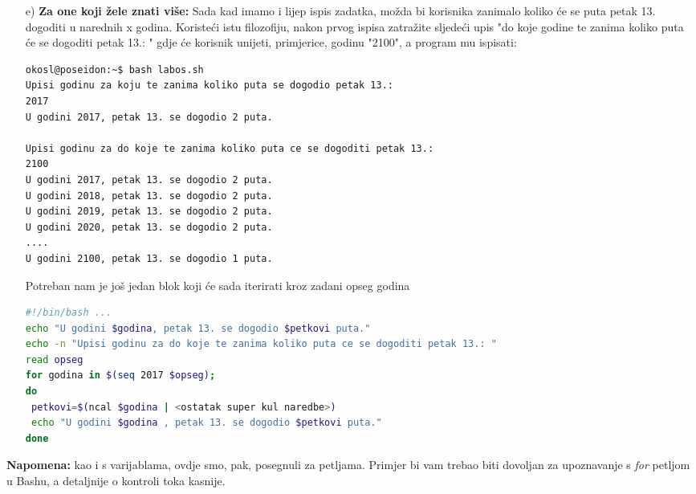 \documentclass{exam}
\begin{document}
\begin{itemize}
\item[e)]
  \textbf{Za one koji žele znati više:}
  Sada kad imamo i lijep ispis zadatka, možda bi korisnika zanimalo koliko 
  će se puta petak 13. dogoditi u narednih x godina. Koristeći istu filozofiju, nakon
  prvog ispisa zatražite sljedeći upis "do koje godine te zanima koliko puta će se
  dogoditi petak 13.: " gdje će korisnik unijeti, primjerice, godinu "2100", a
  program mu ispisati:
  
\begin{lstlisting}[caption={Ispis}]
okosl@poseidon:~$ bash labos.sh
Upisi godinu za koju te zanima koliko puta se dogodio petak 13.: 
2017
U godini 2017, petak 13. se dogodio 2 puta.  
                                                                                                
Upisi godinu za do koje te zanima koliko puta ce se dogoditi petak 13.:
2100
U godini 2017, petak 13. se dogodio 2 puta.
U godini 2018, petak 13. se dogodio 2 puta.
U godini 2019, petak 13. se dogodio 2 puta.
U godini 2020, petak 13. se dogodio 2 puta.
....
U godini 2100, petak 13. se dogodio 1 puta.
\end{lstlisting}

  Potreban nam je još jedan blok koji će sada iterirati kroz zadani opseg godina
  
\begin{lstlisting}[language=bash,caption={Iteracija po opsegu}]
#!/bin/bash ...
echo "U godini $godina, petak 13. se dogodio $petkovi puta."
echo -n "Upisi godinu za do koje te zanima koliko puta ce se dogoditi petak 13.: "
read opseg
for godina in $(seq 2017 $opseg);
do 
 petkovi=$(ncal $godina | <ostatak super kul naredbe>)
 echo "U godini $godina , petak 13. se dogodio $petkovi puta."
done
\end{lstlisting}
\end{itemize}

\textbf{Napomena: } kao i s varijablama, ovdje smo, pak, posegnuli za petljama. Primjer bi vam trebao biti dovoljan za upoznavanje s \textit{for} petljom u Bashu, a detaljnije o kontroli toka kasnije.
\end{document}

